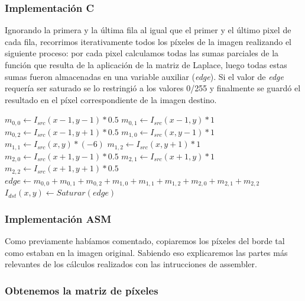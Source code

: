 \subsubsection{Implementación C}

Ignorando la primera y la última fila al igual que el primer y el último pixel de cada fila, recorrimos iterativamente todos los píxeles de la imagen realizando el siguiente proceso: por cada pixel calculamos todas las sumas parciales de la función que resulta de la aplicación de la matriz de Laplace, luego todas estas sumas fueron almacenadas en una variable auxiliar (\textit{edge}). Si el valor de \textit{edge} requería ser saturado se lo restringió a los valores 0/255 y finalmente se guardó el resultado en el píxel correspondiente de la imagen destino.

\begin{algorithm}[H]
  \begin{algorithmic}[1]
			  \STATE $m_{0,0} \gets I_{src}(x-1,y-1)*0.5$
			  \STATE $m_{0,1} \gets I_{src}(x-1,y)*1$
			  \STATE $m_{0,2} \gets I_{src}(x-1,y+1)*0.5$
			  \STATE $m_{1,0} \gets I_{src}(x,y-1)*1$
			  \STATE $m_{1,1} \gets I_{src}(x,y)*(-6)$
			  \STATE $m_{1,2} \gets I_{src}(x,y+1)*1$
			  \STATE $m_{2,0} \gets I_{src}(x+1,y-1)*0.5$
			  \STATE $m_{2,1} \gets I_{src}(x+1,y)*1$
			  \STATE $m_{2,2} \gets I_{src}(x+1,y+1)*0.5$
			  \STATE $edge \gets m_{0,0}+m_{0,1}+m_{0,2}+m_{1,0}+m_{1,1}+m_{1,2}+m_{2,0}+m_{2,1}+m_{2,2}$
			  \STATE $I_{dst}(x,y) \gets Saturar(edge)$
			\ENDFOR
		 \ENDFOR
  \end{algorithmic}
  \caption{$edge (I_{src}, I_{dst})$}
  \label{alg:edge}
\end{algorithm}

\subsubsection{Implementación ASM}

Como previamente habíamos comentado, copiaremos los píxeles del borde tal como estaban en la imagen original. Sabiendo eso explicaremos las partes más relevantes de los cálculos realizados con las intrucciones de assembler.

\subsubsection*{Obtenemos la matriz de píxeles}

